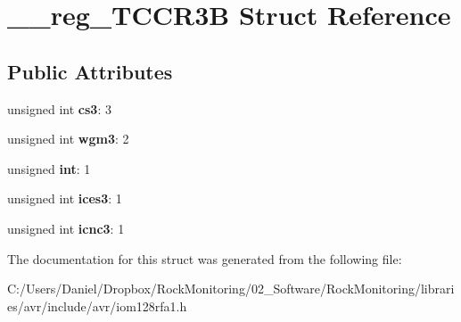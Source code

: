 \hypertarget{struct____reg___t_c_c_r3_b}{}\section{\+\_\+\+\_\+reg\+\_\+\+T\+C\+C\+R3B Struct Reference}
\label{struct____reg___t_c_c_r3_b}
\subsection*{Public Attributes}
\begin{DoxyCompactItemize}
\item 
unsigned int {\bfseries cs3}\+: 3\hypertarget{struct____reg___t_c_c_r3_b_af6c5f53634ec80f3e1210704fc7bd9bb}{}\label{struct____reg___t_c_c_r3_b_af6c5f53634ec80f3e1210704fc7bd9bb}

\item 
unsigned int {\bfseries wgm3}\+: 2\hypertarget{struct____reg___t_c_c_r3_b_aa7fd4581e80eb338bfbd93070c021c70}{}\label{struct____reg___t_c_c_r3_b_aa7fd4581e80eb338bfbd93070c021c70}

\item 
unsigned {\bfseries int}\+: 1\hypertarget{struct____reg___t_c_c_r3_b_add819c94acf5827c3ed197205c9544fa}{}\label{struct____reg___t_c_c_r3_b_add819c94acf5827c3ed197205c9544fa}

\item 
unsigned int {\bfseries ices3}\+: 1\hypertarget{struct____reg___t_c_c_r3_b_a145ec7fb2ce6edce84e5816981adcbfb}{}\label{struct____reg___t_c_c_r3_b_a145ec7fb2ce6edce84e5816981adcbfb}

\item 
unsigned int {\bfseries icnc3}\+: 1\hypertarget{struct____reg___t_c_c_r3_b_a48ae68c94b0dc2461c78ecc62a97810a}{}\label{struct____reg___t_c_c_r3_b_a48ae68c94b0dc2461c78ecc62a97810a}

\end{DoxyCompactItemize}


The documentation for this struct was generated from the following file\+:\begin{DoxyCompactItemize}
\item 
C\+:/\+Users/\+Daniel/\+Dropbox/\+Rock\+Monitoring/02\+\_\+\+Software/\+Rock\+Monitoring/libraries/avr/include/avr/iom128rfa1.\+h\end{DoxyCompactItemize}
